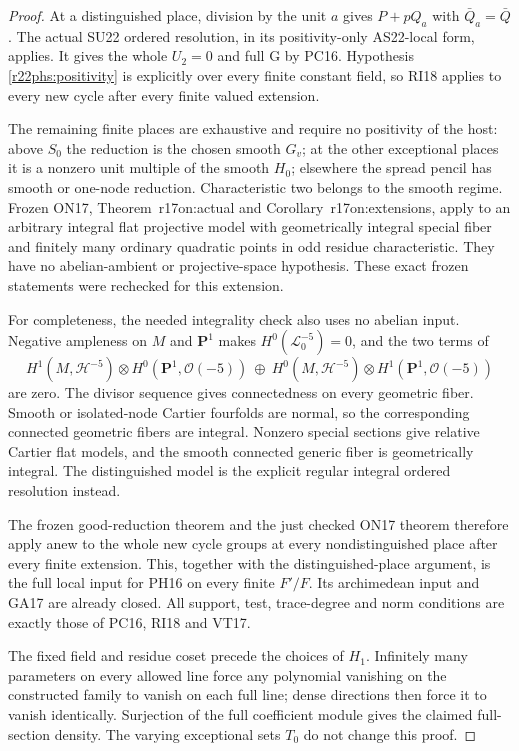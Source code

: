 \begin{proof}
At a distinguished place, division
by the unit $a$ gives $P+pQ_a$ with
$\bar Q_a=\bar Q$.  The actual SU22
ordered resolution, in its
positivity-only AS22-local form,
applies.  It gives the whole
$U_2=0$ and full G by PC16.
Hypothesis \eqref{r22phs:positivity}
is explicitly over every finite
constant field, so RI18 applies
to every new cycle after every
finite valued extension.

The remaining finite places are
exhaustive and require no positivity
of the host: above $S_0$ the
reduction is the chosen smooth
$G_v$; at the other exceptional
places it is a nonzero unit
multiple of the smooth $H_0$;
elsewhere the spread pencil has
smooth or one-node reduction.
Characteristic two belongs to
the smooth regime.  Frozen ON17,
Theorem~\textup{r17on:actual} and
Corollary~\textup{r17on:extensions},
apply to an arbitrary integral
flat projective model with
geometrically integral special
fiber and finitely many ordinary
quadratic points in odd residue
characteristic.  They have no
abelian-ambient or projective-space
hypothesis.  These exact frozen
statements were rechecked for
this extension.

For completeness, the needed
integrality check also uses no
abelian input.  Negative ampleness
on $M$ and $\mathbf P^1$ makes
$H^0(\mathcal L_0^{-5})=0$, and
the two terms of
\[
 H^1(M,\mathcal H^{-5})\otimes
                  H^0(\mathbf P^1,\mathcal O(-5))
 \ \oplus\
 H^0(M,\mathcal H^{-5})\otimes
                  H^1(\mathbf P^1,\mathcal O(-5))
 \tag{PSH22.5}\label{r22phs:negative}
\]
are zero.  The divisor sequence
gives connectedness on every
geometric fiber.  Smooth or
isolated-node Cartier fourfolds
are normal, so the corresponding
connected geometric fibers are
integral.  Nonzero special
sections give relative Cartier
flat models, and the smooth
connected generic fiber is
geometrically integral.  The
distinguished model is the
explicit regular integral
ordered resolution instead.

The frozen good-reduction theorem
and the just checked ON17 theorem
therefore apply anew to the
whole new cycle groups at
every nondistinguished place
after every finite extension.
This, together with the
distinguished-place argument,
is the full local input for
PH16 on every finite $F'/F$.
Its archimedean input and GA17
are already closed.  All support,
test, trace-degree and norm
conditions are exactly those
of PC16, RI18 and VT17.

The fixed field and residue
coset precede the choices of
$H_1$.  Infinitely many
parameters on every allowed
line force any polynomial
vanishing on the constructed
family to vanish on each full
line; dense directions then
force it to vanish identically.
Surjection of the full
coefficient module gives the
claimed full-section density.
The varying exceptional sets
$T_0$ do not change this proof.


\end{proof}
